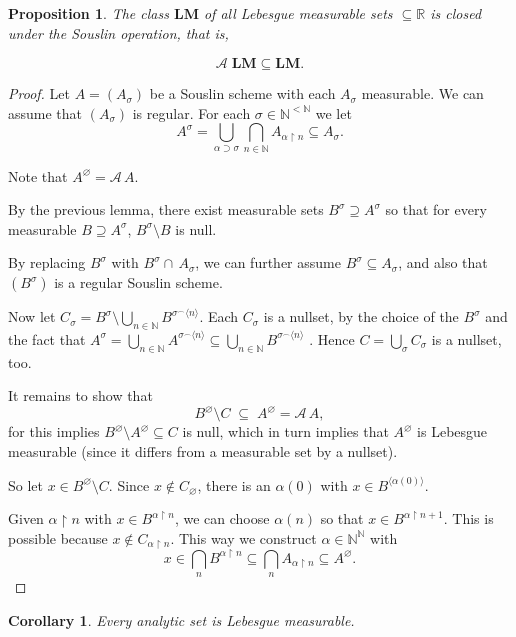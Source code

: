 \documentclass{article}
\newcommand{\Baire}{\Nat^{\Nat}}
\newcommand{\Rest}[1]{\upharpoonright{#1}}
\newcommand{\Tup}[1]{\langle #1 \rangle}
\newcommand{\Real}{\mathbb{R}}
\newcommand{\Nstr}{\Nat^{<\Nat}}
\newcommand{\Nat}{\mathbb{N}}
\newcommand{\Estr}{\varnothing}
\newcommand{\Conc}{\mbox{}^\frown}
\newtheorem{corollary}{Corollary}[theorem]
\newtheorem{proposition}{Proposition}[section]
\begin{document}
\begin{proposition}\label{prop-souslin-lebesgue}The class $\mathbf{LM}$ of all Lebesgue measurable sets $\subseteq \Real$ is closed under the Souslin operation, that is,

\begin{equation}
\mathcal{A} \; \mathbf{LM} \subseteq  \mathbf{LM}.
\end{equation}

\end{proposition}\begin{proof}Let $A = (A_\sigma)$ be a Souslin scheme with each $A_\sigma$ measurable. We can assume that $(A_\sigma)$ is regular. For each $\sigma \in \Nstr$ we let
\begin{equation*}
A^\sigma = \bigcup_{\alpha \supset \sigma} \bigcap_{n \in \Nat} A_{\alpha\Rest{n}} \subseteq A_\sigma.
\end{equation*}

Note that $A^\Estr = \mathcal{A}\, A$.

By the previous lemma, there exist measurable sets $B^\sigma \supseteq A^\sigma$ so that for every measurable $B \supseteq A^\sigma$, $B^\sigma \setminus B$ is null.

By replacing $B^\sigma$ with $B^\sigma \cap \, A_\sigma$, we can further assume $B^\sigma \subseteq A_\sigma$, and also that $(B^\sigma)$ is a regular Souslin scheme.

Now let $C_\sigma = B^\sigma \setminus \bigcup_{n \in \Nat} B^{\sigma\Conc\Tup{n}}$. Each $C_\sigma$ is a nullset, by the choice of the $B^\sigma$ and the fact that  $A^\sigma = \bigcup_{n \in \Nat} A^{\sigma\Conc\Tup{n}} \subseteq \bigcup_{n \in \Nat} B^{\sigma\Conc\Tup{n}}$ . Hence $C= \bigcup_{\sigma} C_\sigma$ is a nullset, too.

It remains to show that
\begin{equation*}
B^\Estr \setminus C \; \subseteq \;  A^\Estr = \mathcal{A}\, A,
\end{equation*}
for this implies $B^\Estr \setminus A^\Estr \subseteq C$ is null, which in turn implies that $A^\Estr$ is Lebesgue measurable (since it differs from a measurable set by a nullset).

So let $x \in B^\Estr \setminus C$. Since $x \not \in C_\Estr$, there is an $\alpha(0)$ with $x \in B^{\Tup{\alpha(0)}}$.

Given $\alpha\Rest{n}$ with $x \in B^{\alpha\Rest{n}}$, we can choose $\alpha(n)$ so that $x \in B^{\alpha\Rest{n+1}}$. This is possible because $x \not \in C_{\alpha\Rest{n}}$. This way we construct $\alpha \in \Baire$ with
\begin{equation*}
x \in \bigcap_n B^{\alpha\Rest{n}} \subseteq  \bigcap_n A_{\alpha\Rest{n}} \subseteq A^\Estr.
\end{equation*}
\end{proof}\begin{corollary}\label{cor-analytic-measurable}Every analytic set is Lebesgue measurable.


\end{corollary}
\end{document}
